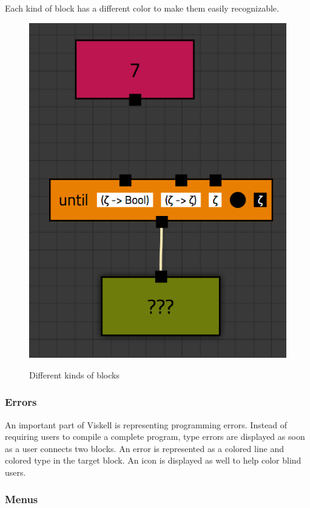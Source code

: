 Each kind of block has a different color to make them easily recognizable.

\begin{figure}[p]
	\centering
	\includegraphics[scale=0.5]{Images/blocks-example}
	\label{fig:blocks-example}
	\caption{Different kinds of blocks}
\end{figure}

\subsubsection{Errors}

An important part of Viskell is representing programming errors.
Instead of requiring users to compile a complete program, type errors are displayed as soon as a user connects two blocks.
An error is represented as a colored line and colored type in the target block.
An icon is displayed as well to help color blind users.

\subsubsection{Menus}

